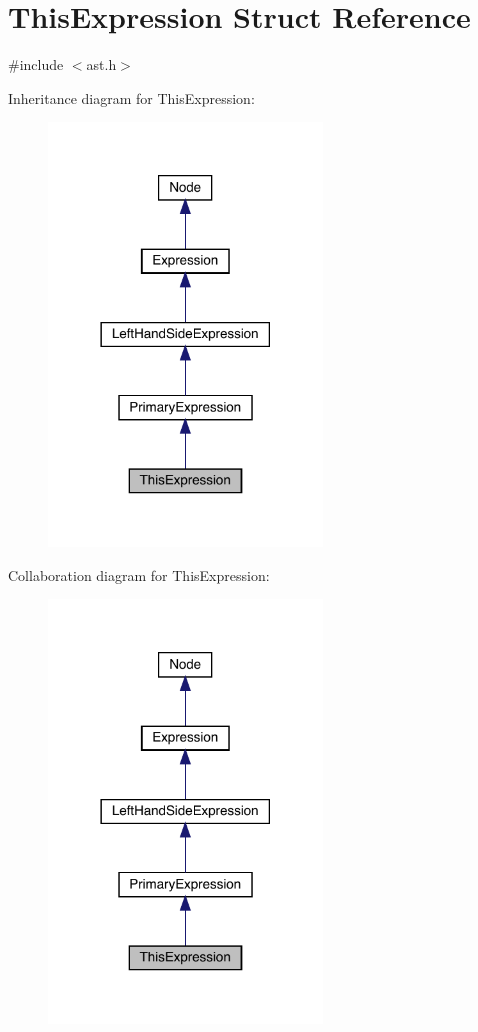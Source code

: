 \hypertarget{struct_this_expression}{}\section{This\+Expression Struct Reference}
\label{struct_this_expression}


{\ttfamily \#include $<$ast.\+h$>$}



Inheritance diagram for This\+Expression\+:
\nopagebreak
\begin{figure}[H]
\begin{center}
\leavevmode
\includegraphics[width=206pt]{struct_this_expression__inherit__graph}
\end{center}
\end{figure}


Collaboration diagram for This\+Expression\+:
\nopagebreak
\begin{figure}[H]
\begin{center}
\leavevmode
\includegraphics[width=206pt]{struct_this_expression__coll__graph}
\end{center}
\end{figure}
